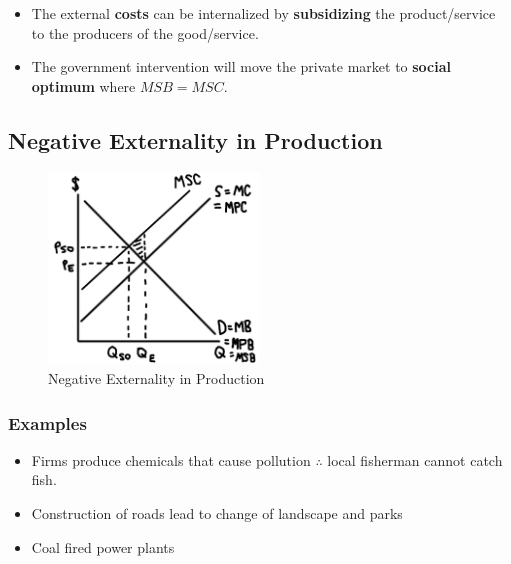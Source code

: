 \documentclass[
  letterpaper,
  DIV=11,
  numbers=noendperiod]{scrartcl}
\providecommand{\tightlist}{%
  \setlength{\itemsep}{0pt}\setlength{\parskip}{0pt}}\usepackage{longtable,booktabs,array}
\begin{document}
\begin{itemize}
\tightlist
\item
  The external \textbf{costs} can be internalized by
  \textbf{subsidizing} the product/service to the producers of the
  good/service.
\item
  The government intervention will move the private market to
  \textbf{social optimum} where \(MSB = MSC\).
\end{itemize}

\newpage{}

\subsection{Negative Externality in
Production}\label{negative-externality-in-production}

\begin{figure}[H]

{\centering \includegraphics[width=0.5\textwidth,height=\textheight]{img/neg-prod.png}

}

\caption{Negative Externality in Production}

\end{figure}%

\subsubsection{Examples}\label{examples-5}

\begin{itemize}
\tightlist
\item
  Firms produce chemicals that cause pollution \(\therefore\) local
  fisherman cannot catch fish.
\item
  Construction of roads lead to change of landscape and parks
\item
  Coal fired power plants
\end{itemize}
\end{document}

